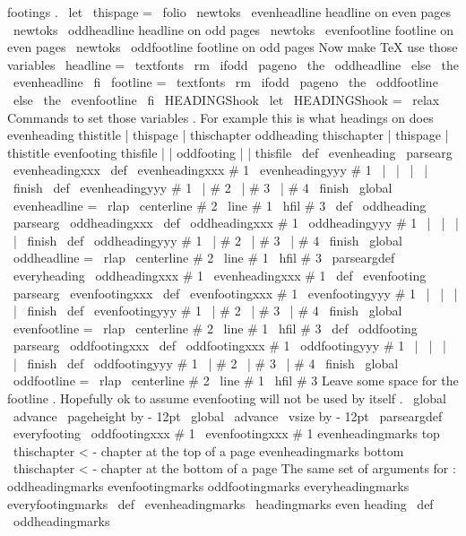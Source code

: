 {{{footings
.
\
let
\
thispage
=
\
folio
\
newtoks
\
evenheadline
%
headline
on
even
pages
\
newtoks
\
oddheadline
%
headline
on
odd
pages
\
newtoks
\
evenfootline
%
footline
on
even
pages
\
newtoks
\
oddfootline
%
footline
on
odd
pages
%
Now
make
TeX
use
those
variables
\
headline
=
{
{
\
textfonts
\
rm
\
ifodd
\
pageno
\
the
\
oddheadline
\
else
\
the
\
evenheadline
\
fi
}
}
\
footline
=
{
{
\
textfonts
\
rm
\
ifodd
\
pageno
\
the
\
oddfootline
\
else
\
the
\
evenfootline
\
fi
}
\
HEADINGShook
}
\
let
\
HEADINGShook
=
\
relax
%
Commands
to
set
those
variables
.
%
For
example
this
is
what
headings
on
does
%
evenheading
thistitle
|
thispage
|
thischapter
%
oddheading
thischapter
|
thispage
|
thistitle
%
evenfooting
thisfile
|
|
%
oddfooting
|
|
thisfile
\
def
\
evenheading
{
\
parsearg
\
evenheadingxxx
}
\
def
\
evenheadingxxx
#
1
{
\
evenheadingyyy
#
1
\
|
\
|
\
|
\
|
\
finish
}
\
def
\
evenheadingyyy
#
1
\
|
#
2
\
|
#
3
\
|
#
4
\
finish
{
%
\
global
\
evenheadline
=
{
\
rlap
{
\
centerline
{
#
2
}
}
\
line
{
#
1
\
hfil
#
3
}
}
}
\
def
\
oddheading
{
\
parsearg
\
oddheadingxxx
}
\
def
\
oddheadingxxx
#
1
{
\
oddheadingyyy
#
1
\
|
\
|
\
|
\
|
\
finish
}
\
def
\
oddheadingyyy
#
1
\
|
#
2
\
|
#
3
\
|
#
4
\
finish
{
%
\
global
\
oddheadline
=
{
\
rlap
{
\
centerline
{
#
2
}
}
\
line
{
#
1
\
hfil
#
3
}
}
}
\
parseargdef
\
everyheading
{
\
oddheadingxxx
{
#
1
}
\
evenheadingxxx
{
#
1
}
}
%
\
def
\
evenfooting
{
\
parsearg
\
evenfootingxxx
}
\
def
\
evenfootingxxx
#
1
{
\
evenfootingyyy
#
1
\
|
\
|
\
|
\
|
\
finish
}
\
def
\
evenfootingyyy
#
1
\
|
#
2
\
|
#
3
\
|
#
4
\
finish
{
%
\
global
\
evenfootline
=
{
\
rlap
{
\
centerline
{
#
2
}
}
\
line
{
#
1
\
hfil
#
3
}
}
}
\
def
\
oddfooting
{
\
parsearg
\
oddfootingxxx
}
\
def
\
oddfootingxxx
#
1
{
\
oddfootingyyy
#
1
\
|
\
|
\
|
\
|
\
finish
}
\
def
\
oddfootingyyy
#
1
\
|
#
2
\
|
#
3
\
|
#
4
\
finish
{
%
\
global
\
oddfootline
=
{
\
rlap
{
\
centerline
{
#
2
}
}
\
line
{
#
1
\
hfil
#
3
}
}
%
%
%
Leave
some
space
for
the
footline
.
Hopefully
ok
to
assume
%
evenfooting
will
not
be
used
by
itself
.
\
global
\
advance
\
pageheight
by
-
12pt
\
global
\
advance
\
vsize
by
-
12pt
}
\
parseargdef
\
everyfooting
{
\
oddfootingxxx
{
#
1
}
\
evenfootingxxx
{
#
1
}
}
%
evenheadingmarks
top
\
thischapter
<
-
chapter
at
the
top
of
a
page
%
evenheadingmarks
bottom
\
thischapter
<
-
chapter
at
the
bottom
of
a
page
%
%
The
same
set
of
arguments
for
:
%
%
oddheadingmarks
%
evenfootingmarks
%
oddfootingmarks
%
everyheadingmarks
%
everyfootingmarks
\
def
\
evenheadingmarks
{
\
headingmarks
{
even
}
{
heading
}
}
\
def
\
oddheadingmarks
}}}
